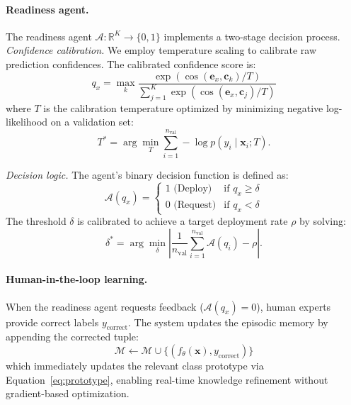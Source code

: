 \documentclass{article}
\begin{document}
\paragraph{Readiness agent.}
The readiness agent $\mathcal{A}: \mathbb{R}^K \rightarrow \{0,1\}$ implements a two-stage decision process. \emph{Confidence calibration.} We employ temperature scaling to calibrate raw prediction confidences. The calibrated confidence score is:
\begin{equation}
q_x = \max_k \frac{\exp(\cos(\mathbf{e}_x, \mathbf{c}_k) / T)}{\sum_{j=1}^{K} \exp(\cos(\mathbf{e}_x, \mathbf{c}_j) / T)} \label{eq:calibration}
\end{equation}
where $T$ is the calibration temperature optimized by minimizing negative log-likelihood on a validation set:
\begin{equation}
T^* = \arg\min_T \sum_{i=1}^{n_{\text{val}}} -\log p(y_i\mid\mathbf{x}_i; T). \label{eq:temperature_opt}
\end{equation}

\emph{Decision logic.} The agent's binary decision function is defined as:
\begin{equation}
\mathcal{A}(q_x) = \begin{cases}
1 \text{ (Deploy)} & \text{if } q_x \geq \delta \\
0 \text{ (Request)} & \text{if } q_x < \delta
\end{cases} \label{eq:decision}
\end{equation}
The threshold $\delta$ is calibrated to achieve a target deployment rate $\rho$ by solving:
\begin{equation}
\delta^* = \arg\min_\delta \left|\frac{1}{n_{\text{val}}} \sum_{i=1}^{n_{\text{val}}} \mathcal{A}(q_i) - \rho\right|. \label{eq:threshold_opt}
\end{equation}

\paragraph{Human-in-the-loop learning.}
When the readiness agent requests feedback ($\mathcal{A}(q_x) = 0$), human experts provide correct labels $y_{\text{correct}}$. The system updates the episodic memory by appending the corrected tuple:
\begin{equation}
\mathcal{M} \leftarrow \mathcal{M} \cup \{(f_\theta(\mathbf{x}), y_{\text{correct}})\} \label{eq:memory_update}
\end{equation}
which immediately updates the relevant class prototype via Equation~\eqref{eq:prototype}, enabling real-time knowledge refinement without gradient-based optimization.
\end{document}
